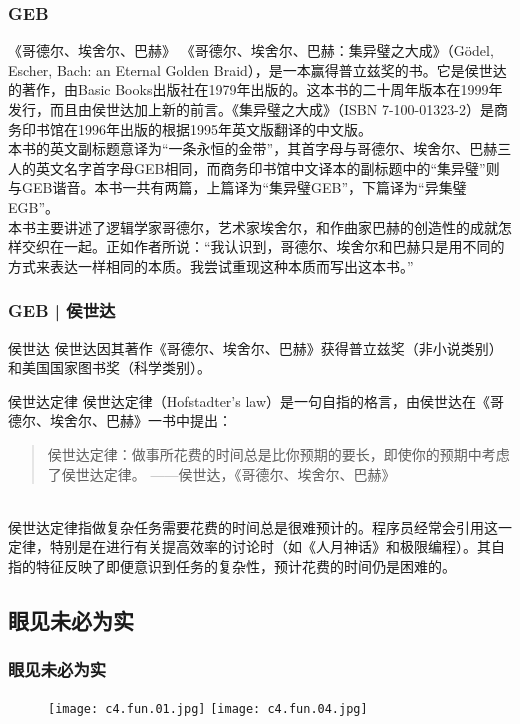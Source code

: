 \begin{frame}
  \frametitle{GEB}
  \begin{block}{《哥德尔、埃舍尔、巴赫》}
    《哥德尔、埃舍尔、巴赫：集异璧之大成》（Gödel, Escher, Bach: an Eternal Golden Braid），是一本赢得普立兹奖的书。它是侯世达的著作，由Basic Books出版社在1979年出版的。这本书的二十周年版本在1999年发行，而且由侯世达加上新的前言。《集异璧之大成》（ISBN 7-100-01323-2）是商务印书馆在1996年出版的根据1995年英文版翻译的中文版。\\
    \vspace{0.3em}
本书的英文副标题意译为“一条永恒的金带”，其首字母与哥德尔、埃舍尔、巴赫三人的英文名字首字母GEB相同，而商务印书馆中文译本的副标题中的“集异璧”则与GEB谐音。本书一共有两篇，上篇译为“集异璧GEB”，下篇译为“异集璧EGB”。 \\
    \vspace{0.3em}
本书主要讲述了逻辑学家哥德尔，艺术家埃舍尔，和作曲家巴赫的创造性的成就怎样交织在一起。正如作者所说：“我认识到，哥德尔、埃舍尔和巴赫只是用不同的方式来表达一样相同的本质。我尝试重现这种本质而写出这本书。”
  \end{block}
\end{frame}

\begin{frame}
  \frametitle{GEB | 侯世达}
  \begin{block}{侯世达}
    侯世达因其著作《哥德尔、埃舍尔、巴赫》获得普立兹奖（非小说类别）和美国国家图书奖（科学类别）。
  \end{block}
  \begin{block}{\alert{侯世达定律}}
    侯世达定律（Hofstadter's law）是一句自指的格言，由侯世达在《哥德尔、埃舍尔、巴赫》一书中提出：
    \begin{quote}
    侯世达定律：做事所花费的时间总是比你预期的要长，即使你的预期中考虑了侯世达定律。 ——侯世达，《哥德尔、埃舍尔、巴赫》
    \end{quote}
\\侯世达定律指做复杂任务需要花费的时间总是很难预计的。程序员经常会引用这一定律，特别是在进行有关提高效率的讨论时（如《人月神话》和极限编程）。其自指的特征反映了即便意识到任务的复杂性，预计花费的时间仍是困难的。
  \end{block}
\end{frame}

\subsection{眼见未必为实}
\begin{frame}
  \frametitle{眼见未必为实}
  \begin{figure}
    \centering
    \texttt{[image: c4.fun.01.jpg]}\quad
    \texttt{[image: c4.fun.04.jpg]}
  \end{figure}
\end{frame}

